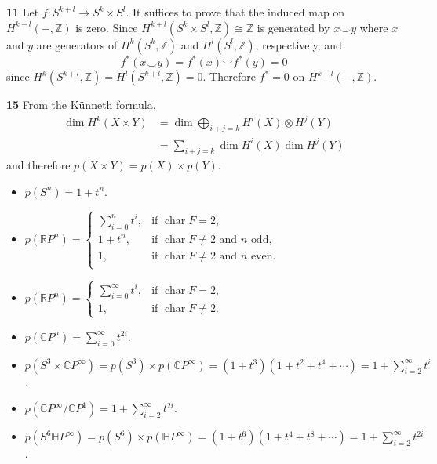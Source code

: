 \documentclass{article}
\makeatletter
\newcommand*{\shifttext}[1]{%
  \settowidth{\@tempdima}{#1}%
  \hspace{-\@tempdima}#1%
}
\newcommand{\plabel}[1]{%
\shifttext{\textbf{#1}\quad}%
}
\makeatother
\begin{document}
\plabel{11}%
Let $f:S^{k+l} \rightarrow S^k \times S^l$.
It suffices to prove that the induced map on $H^{k+l}(-,\mathbb{Z})$ is zero.
Since $H^{k+l}(S^{k}\times S^{l},\mathbb{Z})\cong \mathbb{Z}$ is generated by $x\smile y$ where $x$ and $y$ are generators of $H^{k}(S^k,\mathbb{Z})$ and $H^{l}(S^l,\mathbb{Z})$, respectively, and
\[ f^*(x\smile y) = f^*(x) \smile f^*(y) = 0 \]
since $H^k(S^{k+l},\mathbb{Z}) = H^l(S^{k+l},\mathbb{Z}) = 0$.
Therefore $f^*=0$ on $H^{k+l}(-,\mathbb{Z})$.

\plabel{15}%
From the K\"unneth formula,
\begin{align*}
    \dim H^k(X\times Y) &= \dim \bigoplus_{i+j=k} H^i(X) \otimes H^j(Y) \\
    &= \sum_{i+j=k} \dim H^i(X) \dim H^j(Y)
\end{align*}
and therefore $p(X\times Y) = p(X)\times p(Y)$.
\begin{itemize}
    \item $p(S^n) = 1+t^n$.
    \item $p(\mathbb{R}P^n) = \begin{cases}
        \sum_{i=0}^n t^i, & \text{if } \operatorname{char} F = 2, \\
        1+t^n, & \text{if }\operatorname{char} F \neq 2 \text{ and } n \text{ odd},\\
        1, & \text{if }\operatorname{char} F \neq 2 \text{ and } n \text{ even}.\\
    \end{cases}$
    \item $p(\mathbb{R}P^n) = \begin{cases}
        \sum_{i=0}^\infty t^i, & \text{if } \operatorname{char} F = 2, \\
        1, & \text{if }\operatorname{char} F \neq 2.
    \end{cases}$
    \item $p(\mathbb{C}P^n) = \sum_{i=0}^\infty t^{2i}$.
    \item $p(S^3\times \mathbb{C}P^\infty) = p(S^3) \times p(\mathbb{C}P^\infty) = (1+t^3)(1+t^2+t^4+\cdots) = 1 + \sum_{i=2}^\infty t^i$.
    \item $p(\mathbb{C}P^\infty/\mathbb{C}P^1) = 1+\sum_{i=2}^\infty t^{2i}$.
    \item $p(S^6\mathbb{H}P^\infty) = p(S^6)\times p(\mathbb{H}P^\infty) = (1+t^6)(1+t^4+t^8+\cdots) = 1+\sum_{i=2}^\infty t^{2i}$.
\end{itemize}
\end{document}
